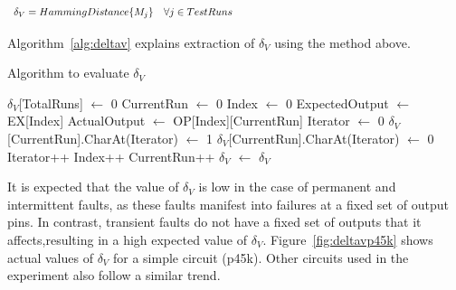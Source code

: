 \[
\begin{array}{lp{10cm}} 
\delta_V = HammingDistance \{ M_j \} & \mbox{$\forall j \in TestRuns$}
\end{array} 
\]

Algorithm~\ref{alg:deltav} explains extraction of $\delta_V$ using the method above.

\begin{algorithm}[H]
  \caption{Algorithm to evaluate $\delta_V$}
  \label{alg:deltav}
  \begin{algorithmic}
 \State $\delta_V$[TotalRuns] $\leftarrow$ 0\;
 \State CurrentRun $\leftarrow$ 0\;
  \State Index $\leftarrow$ 0\;
	\State ExpectedOutput $\leftarrow$ EX[Index]\;
	\State ActualOutput $\leftarrow$ OP[Index][CurrentRun]\;
   \State Iterator $\leftarrow$ 0\;
		 \State $\delta_V$[CurrentRun].CharAt(Iterator) $\leftarrow$ 1\;
		\Else
		 \State $\delta_V$[CurrentRun].CharAt(Iterator) $\leftarrow$ 0\;
		\EndIf
		\State Iterator++\;
		\EndWhile
	\State Index++\;
  \EndWhile
 \State CurrentRun++\;
 \EndWhile
 \State $\delta_V$ $\leftarrow$ \;
 \State \Return $\delta_V$\;
 \EndProcedure
 \end{algorithmic}
\end{algorithm}

It is expected that the value of $\delta_V$ is low in the case of permanent and intermittent faults, as these faults manifest into failures at a fixed set of output pins. In contrast, transient faults do not have a fixed set of outputs that it affects,resulting in a high expected value of $\delta_V$.  Figure~\ref{fig:deltavp45k} shows actual values of $\delta_V$ for a simple circuit (p45k). Other circuits used in the experiment also follow a similar trend.

